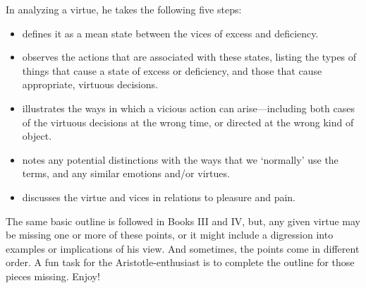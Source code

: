 In analyzing a virtue, he takes the following five steps:

\begin{itemize}
\item defines it as a mean state between the vices of excess and deficiency.

\item observes the actions that are associated with these states, listing the types of things that cause a state of excess or deficiency, and those that cause appropriate, virtuous decisions.

\item illustrates the ways in which a vicious action can arise---including both cases of the virtuous decisions at the wrong time, or directed at the wrong kind of object.

\item notes any potential distinctions with the ways that we `normally' use the terms, and any similar emotions and\slash or virtues.

\item discusses the virtue and vices in relations to pleasure and pain.

\end{itemize}

The same basic outline is followed in Books III and IV, but, any given virtue may be missing one or more of these points, or it might include a digression into examples or implications of his view. And sometimes, the points come in different order. A fun task for the Aristotle-enthusiast is to complete the outline for those pieces missing. Enjoy!

